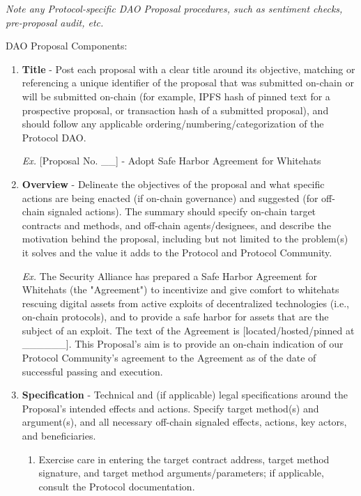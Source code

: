 \textit{Note any Protocol-specific DAO Proposal procedures, such as sentiment checks, pre-proposal audit, etc.}

DAO Proposal Components:

\begin{enumerate}
    \item \textbf{Title} - Post each proposal with a clear title around its objective, matching or referencing a unique identifier of the proposal that was submitted on-chain or will be submitted on-chain (for example, IPFS hash of pinned text for a prospective proposal, or transaction hash of a submitted proposal), and should follow any applicable ordering/numbering/categorization of the Protocol DAO.

          \textit{Ex.} [Proposal No. \_\_] - Adopt Safe Harbor Agreement for Whitehats

    \item \textbf{Overview} - Delineate the objectives of the proposal and what specific actions are being enacted (if on-chain governance) and suggested (for off-chain signaled actions). The summary should specify on-chain target contracts and methods, and off-chain agents/designees, and describe the motivation behind the proposal, including but not limited to the problem(s) it solves and the value it adds to the Protocol and Protocol Community.

          \textit{Ex.} The Security Alliance has prepared a Safe Harbor Agreement for Whitehats (the "Agreement") to incentivize and give comfort to whitehats rescuing digital assets from active exploits of decentralized technologies (i.e., on-chain protocols), and to provide a safe harbor for assets that are the subject of an exploit. The text of the Agreement is [located/hosted/pinned at \_\_\_\_\_\_]. This Proposal's aim is to provide an on-chain indication of our Protocol Community's agreement to the Agreement as of the date of successful passing and execution.

    \item \textbf{Specification} - Technical and (if applicable) legal specifications around the Proposal's intended effects and actions. Specify target method(s) and argument(s), and all necessary off-chain signaled effects, actions, key actors, and beneficiaries.

          \begin{enumerate}[label=\alph*.]
              \item Exercise care in entering the target contract address, target method signature, and target method arguments/parameters; if applicable, consult the Protocol documentation.
          \end{enumerate}


\end{enumerate}
